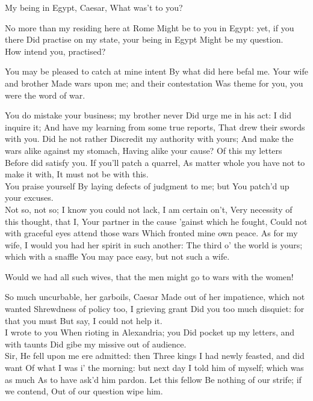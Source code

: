 \documentclass{book}
\begin{document}
\1	My being in Egypt, Caesar,
	What was't to you?

\3	No more than my residing here at Rome
	Might be to you in Egypt: yet, if you there
	Did practise on my state, your being in Egypt
	Might be my question. \\

\1	How intend you, practised?

\3	You may be pleased to catch at mine intent
	By what did here befal me. Your wife and brother
	Made wars upon me; and their contestation
	Was theme for you, you were the word of war.

\1	You do mistake your business; my brother never
	Did urge me in his act: I did inquire it;
	And have my learning from some true reports,
	That drew their swords with you. Did he not rather
	Discredit my authority with yours;
	And make the wars alike against my stomach,
	Having alike your cause? Of this my letters
	Before did satisfy you. If you'll patch a quarrel,
	As matter whole you have not to make it with,
	It must not be with this. \\

\3	You praise yourself
	By laying defects of judgment to me; but
	You patch'd up your excuses.\\

\1	Not so, not so;
	I know you could not lack, I am certain on't,
	Very necessity of this thought, that I,
	Your partner in the cause 'gainst which he fought,
	Could not with graceful eyes attend those wars
	Which fronted mine own peace. As for my wife,
	I would you had her spirit in such another:
	The third o' the world is yours; which with a snaffle
	You may pace easy, but not such a wife.

	Would we had all such wives, that the men might
        go to wars with the women!

\1	So much uncurbable, her garboils, Caesar
	Made out of her impatience, which not wanted
	Shrewdness of policy too, I grieving grant
	Did you too much disquiet: for that you must
	But say, I could not help it. \\

\3	I wrote to you
	When rioting in Alexandria; you
	Did pocket up my letters, and with taunts
	Did gibe my missive out of audience. \\

\1	Sir,
	He fell upon me ere admitted: then
	Three kings I had newly feasted, and did want
	Of what I was i' the morning: but next day
	I told him of myself; which was as much
	As to have ask'd him pardon. Let this fellow
	Be nothing of our strife; if we contend,
	Out of our question wipe him. \\
\end{document}
